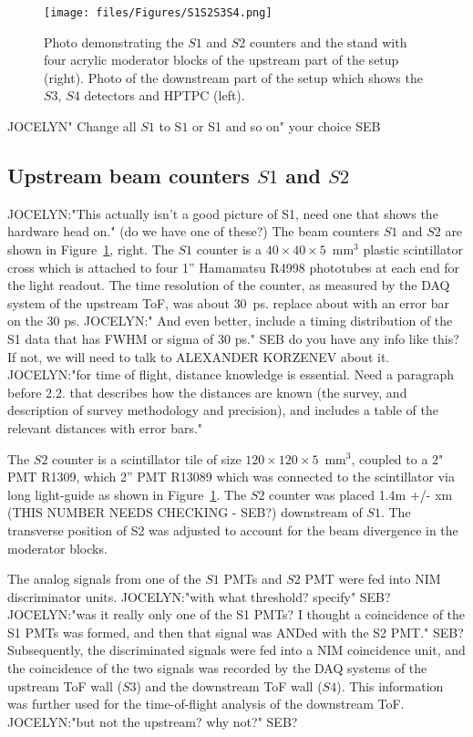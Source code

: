     
    \begin{figure}[t]
      \centering
    \texttt{[image: files/Figures/S1S2S3S4.png]}
    	\caption{Photo demonstrating the $S1$ and $S2$ counters and the stand with four acrylic moderator blocks of the upstream part of the setup (right). Photo of the downstream part of the setup which shows the $S3$, $S4$ detectors and HPTPC (left).}
    		\label{fig:modblocks}
    \end{figure}
    
    JOCELYN" Change all $S1$ to S$1$ or S1 and so on" your choice SEB
	\subsection{Upstream beam counters $S1$ and $S2$}
	JOCELYN:"This actually isn't a good picture of S1, need one that shows the hardware head on." (do we have one of these?)
	The beam counters $S1$ and $S2$ are shown in Figure~\ref{fig:modblocks}, right. The $S1$ counter is a $40\times40\times5$~mm$^3$ plastic scintillator cross which is attached to four 1'' Hamamatsu R4998 phototubes at each end for the light readout. The time resolution of the counter, as measured by the DAQ system of the upstream ToF, was about 30~ps. 
	replace about with an error bar on the 30 ps. JOCELYN:" And even better, include a timing distribution of the S1 data that has FWHM or sigma of 30 ps." SEB do you have any info like this? If not, we will need to talk to ALEXANDER KORZENEV about it.
	JOCELYN:"for time of flight, distance knowledge is essential.  Need a paragraph before 2.2. that describes how the distances are known (the survey, and description of survey methodology and precision), and includes a table of the relevant distances with error bars."
	
	The $S2$ counter is a scintillator tile of size $120\times120\times5$~mm$^3$, coupled to a 2" PMT R1309, which  2'' PMT R13089 which was connected to the scintillator via long light-guide as shown in Figure~\ref{fig:modblocks}. The $S2$ counter was placed 1.4m +/- xm (THIS NUMBER NEEDS CHECKING - SEB?) downstream of $S1$.  The transverse position of S2 was adjusted to account for the beam divergence in the moderator blocks.
	
	The analog signals from one of the $S1$ PMTs and $S2$ PMT were fed into NIM discriminator units. JOCELYN:"with what threshold? specify" SEB?
	JOCELYN:"was it really only one of the S1 PMTs?  I thought a coincidence of the S1 PMTs was formed, and then that signal was ANDed with the S2 PMT." SEB?
	Subsequently, the discriminated signals were fed into a NIM coincidence unit, and the coincidence of the two signals was recorded by the DAQ systems of the upstream ToF wall ($S3$) and the downstream ToF wall ($S4$). This information was further used for the time-of-flight analysis of the downstream ToF. JOCELYN:"but not the upstream? why not?" SEB?

